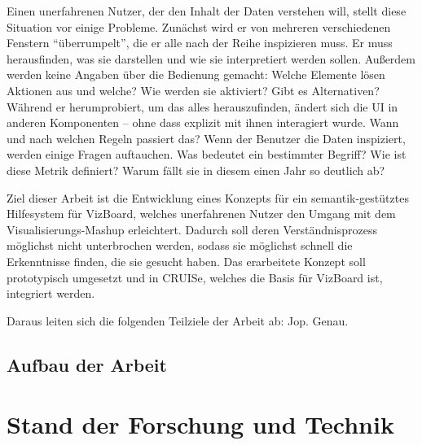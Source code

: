\documentclass[
	headsepline,
	footsepline,
	fontsize=12pt,
	bibliography=totoc
]{scrbook}
\begin{document}
Einen unerfahrenen Nutzer, der den Inhalt der Daten verstehen will, stellt diese Situation vor einige Probleme. Zunächst wird er von mehreren verschiedenen Fenstern \enquote{überrumpelt}, die er alle nach der Reihe inspizieren muss. Er muss herausfinden, was sie darstellen und wie sie interpretiert werden sollen. Außerdem werden keine Angaben über die Bedienung gemacht: Welche Elemente lösen Aktionen aus und welche? Wie werden sie aktiviert? Gibt es Alternativen? Während er herumprobiert, um das alles herauszufinden, ändert sich die UI in anderen Komponenten -- ohne dass explizit mit ihnen interagiert wurde. Wann und nach welchen Regeln passiert das? Wenn der Benutzer die Daten inspiziert, werden einige Fragen auftauchen. Was bedeutet ein bestimmter Begriff? Wie ist diese Metrik definiert? Warum fällt sie in diesem einen Jahr so deutlich ab? 


Ziel dieser Arbeit ist die Entwicklung eines Konzepts für ein semantik-gestütztes Hilfesystem für VizBoard, welches unerfahrenen Nutzer den Umgang mit dem Visualisierungs-Mashup erleichtert. Dadurch soll deren Verständnisprozess möglichst nicht unterbrochen werden, sodass sie möglichst schnell die Erkenntnisse finden, die sie gesucht haben. Das erarbeitete Konzept soll prototypisch umgesetzt und in CRUISe, welches die Basis für VizBoard ist, integriert werden.


Daraus leiten sich die folgenden Teilziele der Arbeit ab: Jop. Genau.

\section{Aufbau der Arbeit}
\label{section:einleitung:aufbau}


\chapter{Stand der Forschung und Technik}
\label{chapter:standderforschung}
\end{document}
